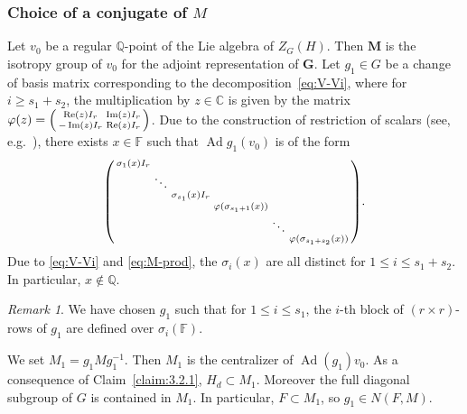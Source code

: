 \documentclass[12pt,reqno]{amsart}
\numberwithin{equation}{section}
\theoremstyle{plain}
\theoremstyle{definition}
\theoremstyle{remark}
\newtheorem{remark}{Remark}[section]
\newcommand\bfG{\mathbf{G}}
\newcommand\bfM{\mathbf{M}}
\newcommand\bbF{\mathbb{F}}
\newcommand{\C}{\mathbb{C}}
\newcommand{\Q}{\mathbb{Q}}
\renewcommand{\Re}{\operatorname{Re}}
\renewcommand{\Im}{\operatorname{Im}}
\DeclareMathOperator{\Ad}{Ad}
\begin{document}
   \subsubsection{Choice of a conjugate of $M$} \label{sec:v0}
     Let $v_0$ be a regular $\Q$-point of the Lie algebra of $Z_G(H)$. Then $\bfM$ is the isotropy group of $v_0$ for the adjoint representation of $\bfG$. Let $g_1\in G$ be a change of basis matrix corresponding to the decomposition~\ref{eq:V-Vi}, where for $i\geq s_1+s_2$, the multiplication by $z\in\C$ is given by the matrix $\varphi(z)=\begin{psmallmatrix}
        \Re(z)I_r & \Im(z)I_r \\
        -\Im(z)I_r & \Re(z)I_r
    \end{psmallmatrix}$. Due to the construction of restriction of scalars (see, e.g.~\cite[Proposition~6.1.3]{Zimmer1984ErgodicGroups}), there exists $x\in \bbF$ such that $\Ad g_1(v_0)$ is of the form
	\begin{equation} \label{eq:adg1v0}
	\begin{psmallmatrix}
	\sigma_{1}(x)I_r & & & & & \\
	& \ddots & & & & \\
	& &  \sigma_{s_1}(x)I_r & & & \\
	& & & \varphi(\sigma_{s_1+1}(x))& & \\
	& & & & \ddots & \\
	& & & & & \varphi(\sigma_{s_1+s_2}(x))
	\end{psmallmatrix}.
	\end{equation}
    Due to \eqref{eq:V-Vi} and \eqref{eq:M-prod}, the $\sigma_i(x)$ are all distinct for $1\leq i\leq s_1+s_2$. In particular, $x\not\in\Q$. 

    \begin{remark} \label{rem:g1-F}
    We have chosen $g_1$ such that for $1\leq i\leq s_1$, the $i$-th block of $(r\times r)$-rows of $g_1$ are defined over $\sigma_i(\bbF)$. 
\end{remark}

    We set $M_1=g_1Mg_1^{-1}$. Then $M_1$ is the centralizer of $\Ad(g_1)v_0$.  As a consequence of Claim~\ref{claim:3.2.1}, $H_d\subset M_1$. Moreover the full diagonal subgroup of $G$ is contained in $M_1$. In particular, $F\subset M_1$, so $g_1\in N(F,M)$. 
\end{document}
